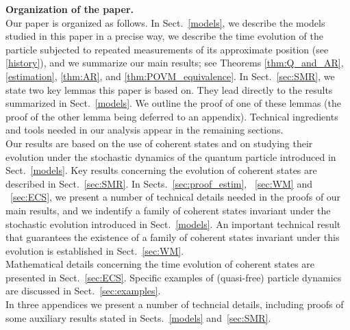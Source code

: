 \documentclass[12pt]{article}
\begin{document}
\bigskip
\noindent
{\bf{Organization of the paper}.}\\
Our paper is organized as follows. In Sect.~\ref{models}, we describe the models studied in this paper in a precise way, we describe the time evolution of the particle subjected to repeated measurements of its approximate position (see \eqref{history}),
and we summarize our main results; see Theorems \ref{thm:Q_and_AR}, \ref{estimation}, \ref{thm:AR}, and \ref{thm:POVM_equivalence}.
In Sect.~\ref{sec:SMR}, we state two key lemmas this paper is based on. They lead directly to the results 
summarized in Sect.~\ref{models}. We outline the proof of one of these lemmas (the proof of the other lemma being deferred to an appendix). Technical ingredients and tools needed in our analysis appear in the remaining sections.\\
Our results are based on the use of coherent states and on studying their evolution under the stochastic 
dynamics of the quantum particle introduced in Sect.~\ref{models}. Key results concerning the evolution of coherent states are described in Sect.~\ref{sec:SMR}. 
In Sects.~\ref{sec:proof_estim}, ~\ref{sec:WM} and ~\ref{sec:ECS}, we present a number of technical details needed in the proofs of our main results, and we indentify a family of coherent states invariant under the stochastic evolution introduced in Sect.~\ref{models}. An important technical result that guarantees the existence of a family of coherent states invariant under this evolution is established in Sect.~\ref{sec:WM}.\\
Mathematical details concerning the time evolution of coherent states are presented in Sect.~\ref{sec:ECS}. 
Specific examples of (quasi-free) particle dynamics are discussed in Sect.~\ref{sec:examples}. \\
In three appendices we present a number of techncial details, including proofs of some auxiliary results stated in 
Sects.~\ref{models} and~\ref{sec:SMR}. 
\end{document}
